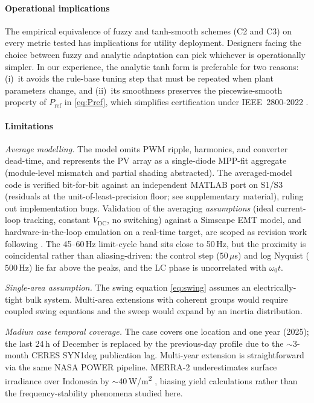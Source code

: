 \documentclass[journal]{IEEEtran}
\begin{document}
\paragraph*{Operational implications}
The empirical equivalence of fuzzy and tanh-smooth schemes (C2 and C3)
on every metric tested has implications for utility deployment.
Designers facing the choice between fuzzy and analytic adaptation can
pick whichever is operationally simpler. In our experience, the
analytic tanh form is preferable for two reasons:
(i)~it avoids the rule-base tuning step that must be repeated when
plant parameters change, and (ii)~its smoothness preserves the
piecewise-smooth property of $P_\mathrm{ref}$ in
\eqref{eq:Pref}, which simplifies certification under IEEE~2800-2022
\cite{ieee28002022}.

\paragraph*{Limitations}
\textit{Average modelling.} The model omits PWM ripple, harmonics, and
converter dead-time, and represents the PV array as a single-diode
MPP-fit aggregate (module-level mismatch and partial shading
abstracted). The averaged-model code is verified bit-for-bit
against an independent MATLAB port on S1/S3 (residuals at the
unit-of-least-precision floor; see supplementary material), ruling
out implementation bugs. Validation of the averaging
\emph{assumptions} (ideal current-loop tracking, constant
$V_\mathrm{DC}$, no switching) against a Simscape EMT model, and
hardware-in-the-loop emulation on a real-time target, are scoped as
revision work following \cite{wang2022describing,kim2025selfexcited}.
The 45--60\,Hz limit-cycle band sits close to 50\,Hz, but the
proximity is coincidental rather than aliasing-driven: the control
step ($50\,\mu$s) and log Nyquist ($500$\,Hz) lie far above the
peaks, and the LC phase is uncorrelated with $\omega_0 t$.

\textit{Single-area assumption.} The swing equation \eqref{eq:swing}
assumes an electrically-tight bulk system. Multi-area extensions with
coherent groups would require coupled swing equations
\cite{rahman2024review} and the sweep would expand by an inertia
distribution.

\textit{Madiun case temporal coverage.} The case covers one location
and one year (2025); the last 24\,h of December is replaced by the
previous-day profile due to the $\sim$3-month CERES SYN1deg
publication lag. Multi-year extension is straightforward via the
same NASA POWER pipeline. MERRA-2 underestimates surface irradiance
over Indonesia by $\sim$40\,W/m\textsuperscript{2}
\cite{rahman2020merra2}, biasing yield calculations rather than the
frequency-stability phenomena studied here.
\end{document}
